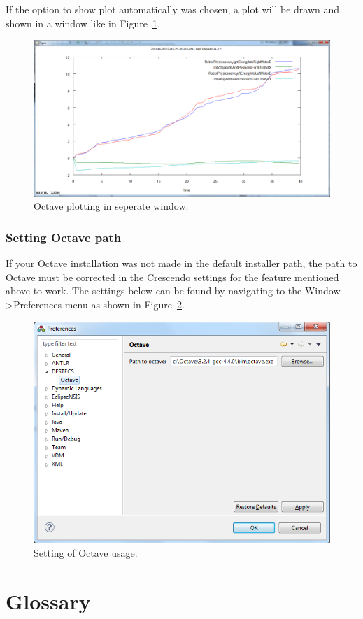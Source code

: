 \documentclass{crescendorepchap}
\begin{document}
If the option to show plot automatically was chosen, a plot will be drawn
and shown in a window like in Figure~\ref{fig:OctavePlotting}.

\begin{figure}[htbp]
\centering
\includegraphics[width=.6\textwidth]{images/OctavePlotting.png}
\caption{Octave plotting in seperate window.\label{fig:OctavePlotting}}
\end{figure}

\subsection{Setting Octave path}

If your Octave installation was not made in the default installer path,
the path to Octave must be corrected in the Crescendo settings for the
feature mentioned above to work. The settings below can be found by
navigating to the Window-\textgreater{}Preferences menu as shown in Figure~\ref{fig:OctaveSetting}.

\begin{figure}[htbp]
\centering
\includegraphics[width=.6\textwidth]{images/OctaveSettings.png}
\caption{Setting of Octave usage.\label{fig:OctaveSetting}}
\end{figure}


\appendix
\newpage


\label{ch:bib} %

\chapter{Glossary}\label{app:Glossary}
\end{document}

